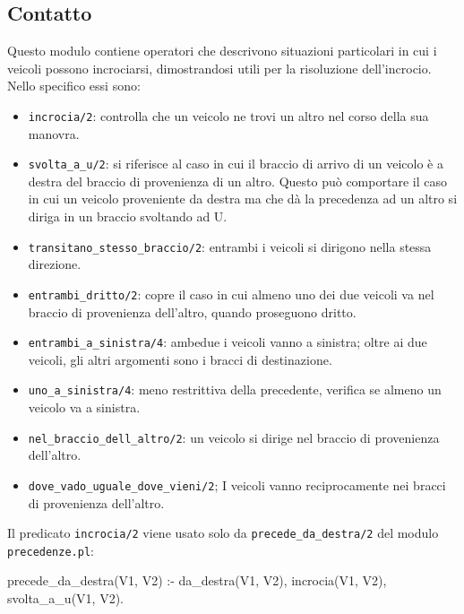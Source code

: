 \subsection{Contatto}
\label{ssec:pos}
Questo modulo contiene operatori che descrivono situazioni particolari in cui i veicoli possono incrociarsi, dimostrandosi utili per la risoluzione dell'incrocio. Nello specifico essi sono:

\begin{itemize}
	\item \texttt{incrocia/2}: controlla che un veicolo ne trovi un altro nel corso della sua manovra.
	
	\item \texttt{svolta\_a\_u/2}: si riferisce al caso in cui il braccio di arrivo di un veicolo è a destra del braccio di provenienza di un altro. Questo può comportare il caso in cui un veicolo proveniente da destra ma che dà la precedenza ad un altro si diriga in un braccio svoltando ad U.
	
	\item \texttt{transitano\_stesso\_braccio/2}: entrambi i veicoli si dirigono nella stessa direzione.
	
	\item \texttt{entrambi\_dritto/2}: copre il caso in cui almeno uno dei due veicoli va nel braccio di provenienza dell'altro, quando proseguono dritto.
	
	\item \texttt{entrambi\_a\_sinistra/4}: ambedue i veicoli vanno a sinistra; oltre ai due veicoli, gli altri argomenti sono i bracci di destinazione.
	
	\item \texttt{uno\_a\_sinistra/4}: meno restrittiva della precedente, verifica se almeno un veicolo va a sinistra.
	
	\item \texttt{nel\_braccio\_dell\_altro/2}: un veicolo si dirige nel braccio di provenienza dell'altro.
	
	\item \texttt{dove\_vado\_uguale\_dove\_vieni/2}; I veicoli vanno reciprocamente nei bracci di provenienza dell'altro.
\end{itemize}

Il predicato \texttt{incrocia/2} viene usato solo da \texttt{precede\_da\_destra/2} del modulo \texttt{precedenze.pl}:

\begin{verbatimtab}
precede_da_destra(V1, V2) :-
	da_destra(V1, V2),
	incrocia(V1, V2),
	\+ svolta_a_u(V1, V2).
\end{verbatimtab}

